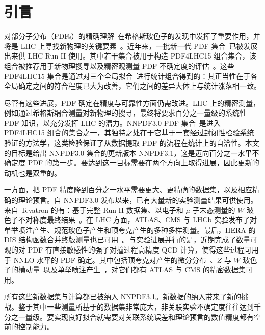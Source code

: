 \section{引言}
\label{sec:introduction}

对部分子分布（PDFs）的精确理解~\cite{Forte:2010dt,Forte:2013wc,Ball:2015oha}在希格斯玻色子的发现中发挥了重要作用，并将是 LHC 上寻找新物理的关键要素~\cite{Rojo:2015acz}。近年来，一批新一代 PDF 集合~\cite{Ball:2014uwa,Dulat:2015mca,Harland-Lang:2014zoa,Alekhin:2017kpj,Abramowicz:2015mha,Jimenez-Delgado:2014twa,Accardi:2016qay}已被发展出来供 LHC Run II 使用。其中若干集合被用于构造 PDF4LHC15 组合集合，该组合被推荐用于新物理搜寻以及精密观测量 PDF 不确定度的评估~\cite{Butterworth:2015oua}。这些 PDF4LHC15 集合是通过对三个全局拟合~\cite{Ball:2014uwa,Dulat:2015mca,Harland-Lang:2014zoa}进行统计组合得到的：其正当性在于各全局确定之间的符合程度已大为改善，它们之间的差异大体上与统计涨落相一致。

尽管有这些进展，PDF 确定在精度与可靠性方面仍需改进。LHC 上的精密测量，例如通过希格斯耦合测量对新物理的搜寻，最终将要求百分之一量级的系统性 PDF 知识，以充分发挥 LHC 的潜力。NNPDF3.0 PDF 集合~\cite{Ball:2014uwa}是进入 PDF4LHC15 组合的集合之一，其独特之处在于它基于一套经过封闭性检验系统验证的方法学，这类检验保证了从数据提取 PDF 的流程在统计上的自洽性。本文的目标是给出 NNPDF3.0 集合的更新版本 NNPDF3.1，这是迈向百分之一水平不确定度 PDF 的第一步。要达到这一目标需要在两个方向上取得进展，因此更新的动机也是双重的。

一方面，把 PDF 精度降到百分之一水平需要更大、更精确的数据集，以及相应精确的理论预言。自 NNPDF3.0 发布以来，已有大量新的实验测量结果可供使用。来自 Tevatron 的有：基于完整 Run II 数据集、以电子和 $\mu$ 子末态测量的 $W$ 玻色子不对称度最终结果~\cite{Abazov:2013rja,D0:2014kma}。在 LHC 方面，ATLAS、CMS 与 LHCb 实验发布了对单举喷注产生、规范玻色子产生和顶夸克产生的多种多样测量。最后，HERA 的 DIS 结构函数合并终版测量也已可用~\cite{Abramowicz:2015mha}。与实验进展并行的是，近期完成了数量可观的对 PDF 有直接敏感性的强子对撞过程高精度 QCD 计算，使得这些过程可用于 NNLO 水平的 PDF 确定。其中包括顶夸克对产生的微分分布~\cite{Czakon:2015owf,Czakon:2016dgf}、$Z$ 与 $W$ 玻色子的横动量~\cite{Boughezal:2015dva,Ridder:2015dxa}以及单举喷注产生~\cite{Currie:2013dwa,Currie:2016bfm}，对它们都有 ATLAS 与 CMS 的精密数据集可用。

所有这些新数据集与计算都已被纳入 NNPDF3.1。新数据的纳入带来了新的挑战。鉴于其中一些测量所基于的数据集非常庞大，非关联实验不确定度往往达到千分之一量级。要实现良好拟合就需要对关联系统误差和理论预言的数值精度都有空前的控制能力。

